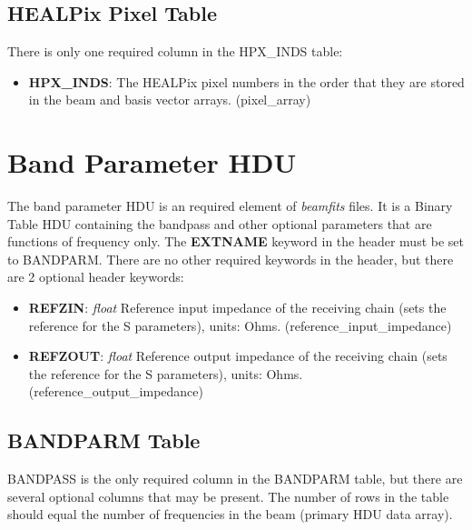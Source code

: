 \documentclass[11pt, oneside]{article}   	%
\begin{document}
\subsection{HEALPix Pixel Table}
There is only one required column in the HPX\_INDS table:

\begin{itemize}
\item{\textbf{HPX\_INDS}: The HEALPix pixel numbers in the order that they are stored in the beam and basis vector arrays. (pixel\_array)}
\end{itemize}

\section{Band Parameter HDU}
The band parameter HDU is an required element of \textit{beamfits} files. It is a Binary Table HDU containing the bandpass and other optional parameters that are functions of frequency only.
The \textbf{EXTNAME} keyword in the header must be set to BANDPARM. There are no other required keywords in the header, but there are 2 optional header keywords:

\begin{itemize}
\item{\textbf{REFZIN}: \textit{float} Reference input impedance of the receiving chain (sets the reference for the S parameters), units: Ohms. (reference\_input\_impedance)}
\item{\textbf{REFZOUT}: \textit{float} Reference output impedance of the receiving chain (sets the reference for the S parameters), units: Ohms. (reference\_output\_impedance)}
\end{itemize}

\subsection{BANDPARM Table}
BANDPASS is the only required column in the BANDPARM table, but there are several optional columns that may be present. The number of rows in the table should equal the number of frequencies in the beam (primary HDU data array).
\end{document}
